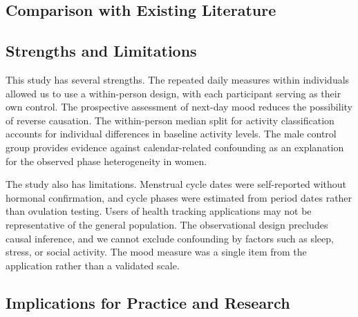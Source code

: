 \documentclass[12pt]{article}
\begin{document}
\subsection*{Comparison with Existing Literature}


\subsection*{Strengths and Limitations}

This study has several strengths. The repeated daily measures within individuals allowed us to use a within-person design, with each participant serving as their own control. The prospective assessment of next-day mood reduces the possibility of reverse causation. The within-person median split for activity classification accounts for individual differences in baseline activity levels. The male control group provides evidence against calendar-related confounding as an explanation for the observed phase heterogeneity in women.

The study also has limitations. Menstrual cycle dates were self-reported without hormonal confirmation, and cycle phases were estimated from period dates rather than ovulation testing. Users of health tracking applications may not be representative of the general population. The observational design precludes causal inference, and we cannot exclude confounding by factors such as sleep, stress, or social activity. The mood measure was a single item from the application rather than a validated scale.

\subsection*{Implications for Practice and Research}

\end{document}
